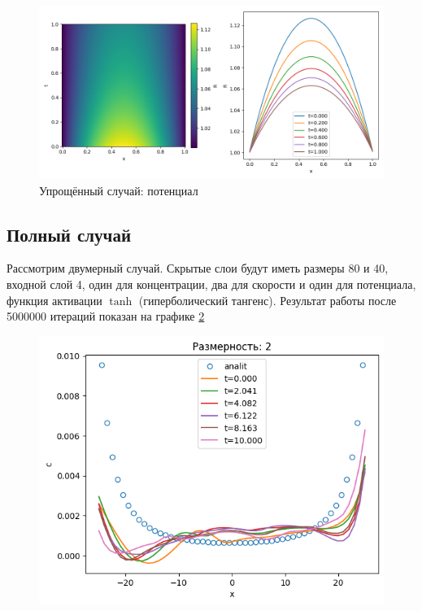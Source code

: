 \documentclass[a4paper,14pt]{extarticle} %
\begin{document}
\begin{figure}[ht]
    \includegraphics[width=\textwidth]{../plots/1-dim Phi simpified tanh 80,20.png}
    \caption{Упрощённый случай: потенциал}
    \label{fig:1d:simp:Fi}
\end{figure}

\subsection{Полный случай}

Рассмотрим двумерный случай. Скрытые слои будут иметь размеры 80 и 40, входной слой 4, один для концентрации, два для скорости и один для потенциала, функция активации $\tanh$ (гиперболический тангенс). Результат работы после 5000000 итераций показан на графике \ref{fig:2dres}

\begin{figure}[ht]
    \includegraphics[scale=0.5]{../plots/2dim tanh 80 20.png}
    \caption{}
    \label{fig:2dres}
\end{figure}
\end{document}
